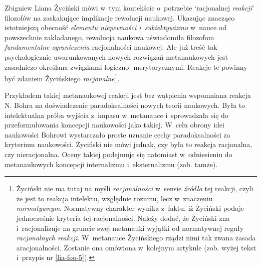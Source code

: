 \begin{artplenv}{Zbigniew Liana}
Życiński mówi w~tym kontekście o~potrzebie `racjonalnej \textit{reakcji}' filozofów
\parencites[s.~143]{zycinski_structure_1988}[s.~254; podkreślenie moje]{zycinski_struktura_2013}
na zaskakujące implikacje rewolucji naukowej. Ukazując znacząco
istotniejszą obecność \textit{elementu niepewności i~subiektywizmu} w~nauce od powszechnie zakładanego, rewolucja naukowa
uświadomiła filozofom \textit{fundamentalne ograniczenia} racjonalności naukowej. Ale już treść tak psychologicznie
uwarunkowanych nowych rozwiązań metanaukowych jest zasadniczo określana związkami
logiczno-\mbox{-merytorycznymi.} %
Reakcje te
powinny być zdaniem Życińskiego \textit{racjonalne}\footnote{Życiński nie ma tutaj na myśli \textit{racjonalności} w~sensie
\textit{źródła} tej reakcji, czyli że jest to reakcja intelektu, względnie rozumu, lecz w~znaczeniu \textit{normatywnym}.
Normatywny charakter wynika z~faktu, iż Życiński podaje jednocześnie kryteria tej racjonalności. Należy dodać, że
Życiński zna i~racjonalizuje na gruncie swej metanauki wyjątki od normatywnej reguły \textit{racjonalnych reakcji}. W~metanauce
Życińskiego rządzi nimi tak zwana zasada aracjonalności. Zostanie ona omówiona w~kolejnym artykule
(zob. wyżej tekst i~przypis nr \ref{lia-foo-5}).}.

Przykładem takiej metanaukowej reakcji jest bez wątpienia wspomniana reakcja N. Bohra na doświadczenie paradoksalności
nowych teorii naukowych. Była to intelektualna próba wyjścia z~impasu w~metanauce i~sprowadzała się do przeformułowania
koncepcji naukowości jako takiej. W~celu obrony idei naukowości Bohrowi wystarczało proste uznanie cechy
paradoksalności za kryterium naukowości. Życiński nie mówi jednak, czy była to reakcja racjonalna, czy nieracjonalna.
Oceny takiej podejmuje się natomiast w~odniesieniu do metanaukowych koncepcji internalizmu i~eksternalizmu (zob.
tamże).


\end{artplenv}
